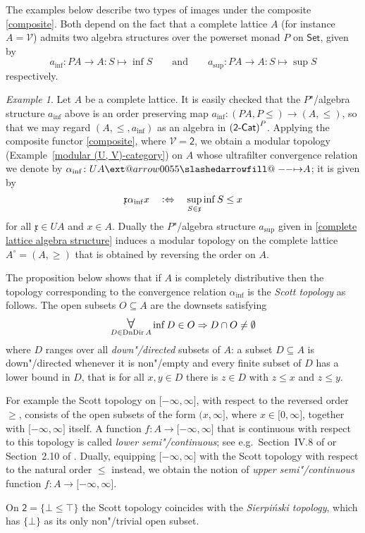 \documentclass[preprint, a4paper]{elsarticle}
\makeatletter
\def\slashedarrowfill@#1#2#3#4#5{%
  $\m@th\thickmuskip0mu\medmuskip\thickmuskip\thinmuskip\thickmuskip
   \relax#5#1\mkern-7mu%
   \cleaders\hbox{$#5\mkern-2mu#2\mkern-2mu$}\hfill
   \mathclap{#3}\mathclap{#2}%
   \cleaders\hbox{$#5\mkern-2mu#2\mkern-2mu$}\hfill
   \mkern-7mu#4$%
}
\def\rightslashedarrowfill@{%
  \slashedarrowfill@\relbar\relbar\mapstochar\rightarrow}
\newcommand\xslashedrightarrow[2][]{%
  \ext@arrow 0055{\rightslashedarrowfill@}{#1}{#2}}
\def\slashedrightarrow{\xslashedrightarrow{}}
\theoremstyle{definition}
\theoremstyle{remark}
\newtheorem{example}[theorem]{Example}
\providecommand{\exref}[1]{Example~\ref{#1}}
\newcommand\defeq{\mathrel{\vcentcolon\Leftrightarrow}}
\renewcommand{\implies}{\Rightarrow}
\providecommand{\mf}[1]{\mathfrak{#1}}
\providecommand{\brcs}[1]{\lbrace #1 \rbrace}
\providecommand{\brks}[1]{\lbrack #1 \rbrack}
\providecommand{\pars}[1]{\left(#1\right)}
\providecommand{\set}[1]{\brcs{#1}}
\providecommand{\isect}{\cap}
\DeclareMathOperator\ForallOp{\mbox{\Large $\mathsurround0pt\forall$}}
\newcommand\Forall{\ForallOp\displaylimits}
\DeclareMathOperator{\DnDir}{DnDir}
\providecommand{\rev}[1]{#1^\circ}
\providecommand{\map}[3]{#1\colon#2\to#3}
\providecommand{\hmap}[3]{#1\colon#2\slashedrightarrow#3}
\providecommand{\catvar}[1]{\mathcal{#1}}
\providecommand{\2}{\mathsf 2}
\providecommand{\V}{\catvar V}
\providecommand{\Set}{\mathsf{Set}}
\providecommand{\Cat}{\mathsf{Cat}}
\providecommand{\enCat}[1]{#1\text-\Cat}
\makeatother
\begin{document}
	The examples below describe two types of images under the composite \eqref{composite}. Both depend on the fact that a complete lattice $A$ (for instance $A = \V$) admits two algebra structures over the powerset monad $P$ on $\Set$, given by
	\begin{equation} \label{complete lattice algebra structure}
		\map{a_{\inf}}{PA}A\colon S\mapsto \inf S \qquad \text{and} \qquad \map{a_{\sup}}{PA}A\colon S\mapsto \sup S
	\end{equation}
	respectively.
	\begin{example} \label{Scott topology}
		Let $A$ be a complete lattice. It is easily checked that the $P$"/algebra structure $a_{\inf}$ above is an order preserving map $\map{a_{\inf}}{(PA, P{\leq})}{(A, \leq)}$, so that we may regard $(A, \leq, a_{\inf})$ as an algebra in $\pars{\enCat\2}^P$. Applying the composite functor \eqref{composite}, where $\V = \2$, we obtain a modular topology (\exref{modular (U, V)-category}) on $A$ whose ultrafilter convergence relation we denote by $\hmap{\alpha_{\inf}}{UA}A$; it is given by
		\begin{displaymath}
			\mf x \alpha_{\inf} x \quad \defeq \quad \sup_{S \in \mf x} \inf S \leq x
		\end{displaymath}
		for all $\mf x \in UA$ and $x \in A$. Dually the $P$"/algebra structure $a_{\sup}$ given in \eqref{complete lattice algebra structure} induces a modular topology on the complete lattice $\rev A = (A, \geq)$ that is obtained by reversing the order on $A$.
		
		The proposition below shows that if $A$ is completely distributive then the topology corresponding to the convergence relation $\alpha_{\inf}$ is the \emph{Scott topology} \cite{Scott72} as follows. The open subsets $O \subseteq A$ are the downsets satisfying
		\begin{equation} \label{Scott open}
			\Forall_{D \in \DnDir A} \inf D \in O \implies D \isect O \neq \emptyset
		\end{equation}
		where $D$ ranges over all \emph{down"/directed} subsets of $A$: a subset $D \subseteq A$ is down"/directed whenever it is non"/empty and every finite subset of $D$ has a lower bound in $D$, that is for all $x, y \in D$ there is $z \in D$ with $z \leq x$ and $z \leq y$.
		
		For example the Scott topology on $\brks{-\infty, \infty}$, with respect to the reversed order $\geq$, consists of the open subsets of the form $(x, \infty ]$, where $x \in \brks{0, \infty}$, together with $\brks{-\infty, \infty}$ itself. A function $\map fA{\brks{-\infty, \infty}}$ that is continuous with respect to this topology is called \emph{lower semi"/continuous}; see e.g.\ Section~IV.8 of \cite{Berge59} or Section~2.10 of \cite{Aliprantis-Border06}. Dually, equipping $\brks{-\infty, \infty}$ with the Scott topology with respect to the natural order $\leq$ instead, we obtain the notion of \emph{upper semi"/continuous} function $\map fA{\brks{-\infty, \infty}}$.
		
		On $\2 = \set{\bot \leq \top}$ the Scott topology coincides with the \emph{Sierpi\'nski topology}, which has $\set{\bot}$ as its only non"/trivial open subset.
	\end{example}
\end{document}
